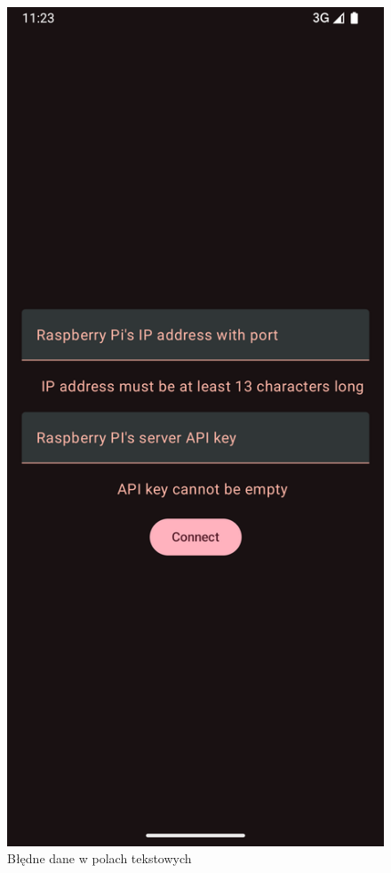 \documentclass[12pt]{article}
\begin{document}
\begin{figure}[H]
    \centering
    \hypertarget{fig:błędne-dane-setup-screen}{}
    \includegraphics[scale=0.25]{figures/setup_screen_wrong_input.png}
    \caption{Błędne dane w polach tekstowych}
    \label{fig:błędne-dane-setup-screen}
\end{figure}
\end{document}
